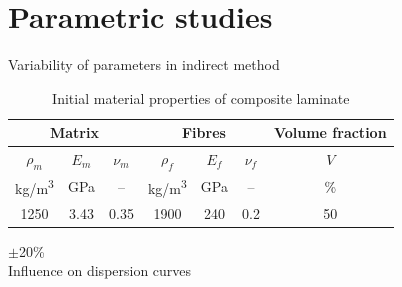 \documentclass[10pt,aspectratio=169]{beamer} %
\begin{document}
\section{Parametric studies}
\begin{frame}[t,label=frame16]{Variability of parameters in \alert{indirect method}}
\begin{table}
	\label{tab:mat_prop}
	\renewcommand{\arraystretch}{1.1}
	\centering \footnotesize
	\caption{Initial material properties of composite laminate}
	\begin{tabular}{ccccccc} 
		\toprule
		\multicolumn{3}{c}{\textbf{Matrix} }	& \multicolumn{3}{c}{\textbf{Fibres} } & \textbf{Volume fraction}	 \\ 
		\midrule
		$\rho_m$ & $E_m$ & $\nu_m$  & $\rho_f$ & $E_f$ & $\nu_f$ & $V$\\
		kg/m\textsuperscript{3} &GPa& --  & kg/m\textsuperscript{3}  & GPa& -- & \%\\ 
		\cmidrule(lr){1-3} \cmidrule(lr){4-6} \cmidrule(lr){7-7}
		1250 &3.43& 0.35& 1900 & 240 & 0.2 & 50\\
		\bottomrule 
	\end{tabular} 
\end{table}
\vspace{10pt}
\centering
\Large $\pm$20\%\\ 
\vspace{10pt}
\normalsize Influence on dispersion curves
\end{frame}
\end{document}
